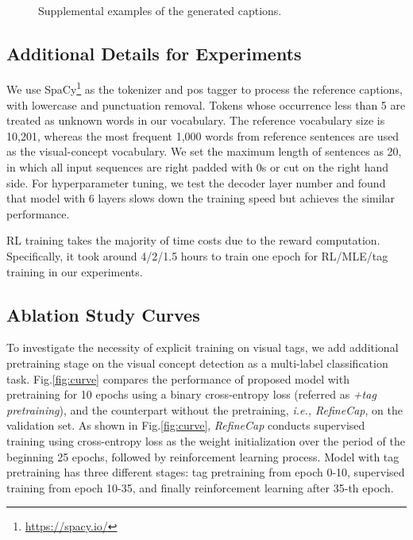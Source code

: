 \documentclass[11pt]{article}
\begin{document}
\begin{figure*}[htp]
  \centering
  \\
  \caption{Supplemental examples of the generated captions.}\label{fig:case3}
\end{figure*}





\subsection{Additional Details for Experiments}
We use SpaCy\footnote[3]{\url{https://spacy.io/}} as the tokenizer and pos tagger to process the reference captions, with lowercase and punctuation removal. Tokens whose occurrence less than 5 are treated as unknown words in our vocabulary. The reference vocabulary size is 10,201, whereas the most frequent 1,000 words from reference sentences are used as the visual-concept vocabulary. 
We set the maximum length of sentences as 20, in which all input sequences are right padded with 0s or cut on the right hand side. For hyperparameter tuning, we test the decoder layer number  and found that model with 6 layers slows down the training speed but achieves the similar performance.

RL training takes the majority of time costs due to the reward computation. Specifically, it took around 4/2/1.5 hours to train one epoch for RL/MLE/tag training in our experiments.


\subsection{Ablation Study Curves}
\label{ap_subsec: ablation}
To investigate the necessity of explicit training on visual tags, we add additional pretraining stage on the visual concept detection as a multi-label classification task.
Fig.\ref{fig:curve} compares the performance of proposed model with pretraining for 10 epochs using a binary cross-entropy loss (referred as \textit{+tag pretraining}), and the counterpart without the pretraining, \emph{i.e., RefineCap}, on the validation set. As shown in Fig.\ref{fig:curve}, \emph{RefineCap} conducts supervised training using cross-entropy loss as the weight initialization over the period of the beginning 25 epochs, followed by reinforcement learning process. Model with tag pretraining has three different stages: tag pretraining from epoch 0-10, supervised training from epoch 10-35, and finally reinforcement learning after 35-th epoch.
\end{document}
